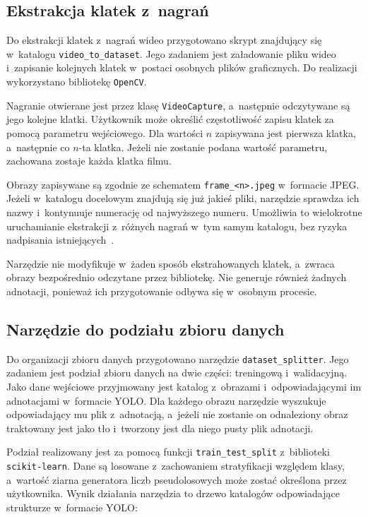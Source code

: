 \subsection{Ekstrakcja klatek z~nagrań}
\label{ssec:extractor}

Do ekstrakcji klatek z~nagrań wideo przygotowano skrypt znajdujący się w~katalogu \texttt{video\_to\_dataset}. Jego zadaniem jest załadowanie pliku wideo i~zapisanie kolejnych klatek w~postaci osobnych plików graficznych. Do realizacji wykorzystano bibliotekę \texttt{OpenCV}.

Nagranie otwierane jest przez klasę \texttt{VideoCapture}, a~następnie odczytywane są jego kolejne klatki. Użytkownik może określić częstotliwość zapisu klatek za pomocą parametru wejściowego. Dla wartości $n$ zapisywana jest pierwsza klatka, a~następnie co $n$-ta klatka. Jeżeli nie zostanie podana wartość parametru, zachowana zostaje każda klatka filmu.

Obrazy zapisywane są zgodnie ze schematem \texttt{frame\_<n>.jpeg} w~formacie JPEG. Jeżeli w~katalogu docelowym znajdują się już jakieś pliki, narzędzie sprawdza ich nazwy i~kontynuuje numerację od najwyższego numeru. Umożliwia to wielokrotne uruchamianie ekstrakcji z~różnych nagrań w~tym samym katalogu, bez ryzyka nadpisania istniejących~.

Narzędzie nie modyfikuje w~żaden sposób ekstrahowanych klatek, a~zwraca obrazy bezpośrednio odczytane przez bibliotekę. Nie generuje również żadnych adnotacji, ponieważ ich przygotowanie odbywa się w~osobnym procesie.

\subsection{Narzędzie do podziału zbioru danych}
\label{ssec:dataset_splitter}

Do organizacji zbioru danych przygotowano narzędzie \texttt{dataset\_splitter}. Jego zadaniem jest podział zbioru danych na dwie części: treningową i~walidacyjną. Jako dane wejściowe przyjmowany jest katalog z~obrazami i~odpowiadającymi im adnotacjami w~formacie YOLO. Dla każdego obrazu narzędzie wyszukuje odpowiadający mu plik z~adnotacją, a~jeżeli nie zostanie on odnaleziony obraz traktowany jest jako tło i~tworzony jest dla niego pusty plik adnotacji.

Podział realizowany jest za pomocą funkcji \texttt{train\_test\_split} z~biblioteki \texttt{scikit-learn}. Dane są losowane z~zachowaniem stratyfikacji względem klasy, a~wartość ziarna generatora liczb pseudolosowych może zostać określona przez użytkownika. Wynik działania narzędzia to drzewo katalogów odpowiadające strukturze w~formacie YOLO:

